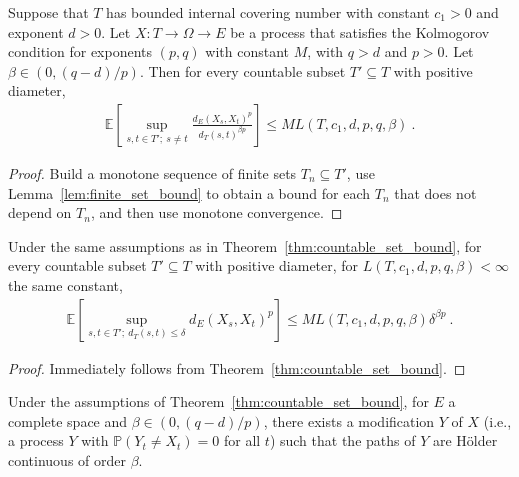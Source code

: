 \begin{theorem}\label{thm:countable_set_bound}
  \leanok
Suppose that $T$ has bounded internal covering number with constant $c_1>0$ and exponent $d > 0$.
Let $X : T \to \Omega \to E$ be a process that satisfies the Kolmogorov condition for exponents $(p,q)$ with constant $M$, with $q > d$ and $p > 0$.
Let $\beta \in(0, (q - d)/p)$.
Then for every countable subset $T' \subseteq T$ with positive diameter,
\begin{align*}
  \mathbb{E}\left[ \sup_{s, t \in T';\: s \ne t} \frac{d_E(X_s, X_t)^p}{d_T(s, t)^{\beta p}} \right]
  \le M L(T, c_1, d, p, q, \beta)
  \: .
\end{align*}
\end{theorem}

\begin{proof}\leanok
Build a monotone sequence of finite sets $T_n \subseteq T'$, use Lemma~\ref{lem:finite_set_bound} to obtain a bound for each $T_n$ that does not depend on $T_n$, and then use monotone convergence.
\end{proof}


\begin{corollary}\label{cor:countable_set_bound_of_le}
Under the same assumptions as in Theorem~\ref{thm:countable_set_bound}, for every countable subset $T' \subseteq T$ with positive diameter, for $L(T, c_1, d, p, q, \beta) < \infty$ the same constant,
\begin{align*}
  \mathbb{E}\left[ \sup_{s, t \in T';\: d_T(s, t) \le \delta} d_E(X_s, X_t)^p \right]
  \le M L(T, c_1, d, p, q, \beta) \delta^{\beta p}
  \: .
\end{align*}
\end{corollary}

\begin{proof}
Immediately follows from Theorem~\ref{thm:countable_set_bound}.
\end{proof}


\begin{lemma}\label{lem:holder_modification_single}
  \leanok
Under the assumptions of Theorem~\ref{thm:countable_set_bound}, for $E$ a complete space and $\beta \in (0, (q - d)/p)$, there exists a modification $Y$ of $X$ (i.e., a process $Y$ with $\mathbb{P}(Y_t \ne X_t) = 0$ for all $t$) such that the paths of $Y$ are Hölder continuous of order $\beta$.
\end{lemma}

